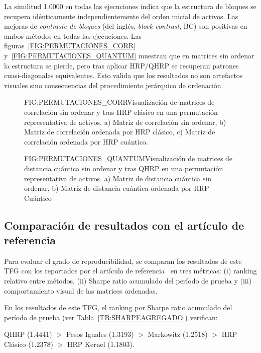 La similitud 1.0000 en todas las ejecuciones indica que la estructura de bloques se recupera idénticamente independientemente del orden inicial de activos. Las mejoras de \textit{contraste de bloques} (del inglés, \textit{block contrast}, $\mathrm{BC}$) son positivas en ambos métodos en todas las ejecuciones. Las figuras~\ref{FIG:PERMUTACIONES_CORR} y~\ref{FIG:PERMUTACIONES_QUANTUM} muestran que en matrices sin ordenar la estructura se pierde, pero tras aplicar \gls{HRP}/\gls{QHRP} se recuperan patrones cuasi-diagonales equivalentes. Esto valida que los resultados no son artefactos visuales sino consecuencias del procedimiento jerárquico de ordenación.

\begin{figure}[Invarianza frente a permutaciones: correlación]{FIG:PERMUTACIONES_CORR}{Visualización de matrices de correlación sin ordenar y tras HRP clásico en una permutación representativa de activos. a) Matriz de correlación sin ordenar, b) Matriz de correlación ordenada por HRP clásico, c) Matriz de correlación ordenada por HRP cuántico.}
\end{figure}

\begin{figure}[Invarianza frente a permutaciones: cuántica]{FIG:PERMUTACIONES_QUANTUM}{Visualización de matrices de distancia cuántica sin ordenar y tras QHRP en una permutación representativa de activos. a) Matriz de distancia cuántica sin ordenar, b) Matriz de distancia cuántica ordenada por HRP Cuántico}
\end{figure}

\subsection{Comparación de resultados con el artículo de referencia}
Para evaluar el grado de reproducibilidad, se comparan los resultados de este TFG con los reportados por el artículo de referencia~\cite{arian2025qhrp} en tres métricas: (i) ranking relativo entre métodos, (ii) Sharpe ratio acumulado del período de prueba y (iii) comportamiento visual de las matrices ordenadas.

En los resultados de este TFG, el ranking por Sharpe ratio acumulado del período de prueba (ver Tabla~\ref{TB:SHARPEAGREGADO}) verifican:

\begin{center}
QHRP (1.4441) $>$ Pesos Iguales (1.3193) $>$ Markowitz (1.2518) $>$ HRP Clásico (1.2378) $>$ HRP Kernel (1.1803).
\end{center}


